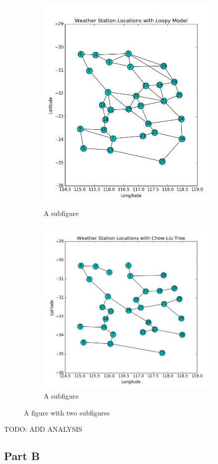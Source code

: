 \documentclass[twoside,11pt]{article}
\theoremstyle{definition}
\begin{document}
\begin{figure}
\centering
\begin{subfigure}{.5\textwidth}
  \centering
  \includegraphics[width=.4\linewidth]{loopyModelFigure2.png}
  \caption{A subfigure}
\end{subfigure}%
\begin{subfigure}{.5\textwidth}
  \centering
  \includegraphics[width=.4\linewidth]{chowLiuTreeFigure2.png}
  \caption{A subfigure}
\end{subfigure}
\caption{A figure with two subfigures}
\end{figure}

TODO: ADD ANALYSIS
\newpage

\subsection*{Part B}
\end{document}
